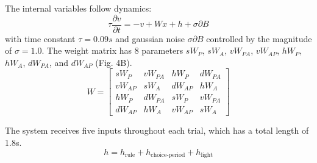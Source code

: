 \documentclass[11pt]{article}
\begin{document}
 The internal variables follow dynamics:
\begin{equation}
\tau \frac{\partial v}{\partial t} = -v + Wx + h + \sigma \partial B
\end{equation}
with time constant $\tau = 0.09s$ and gaussian noise $\sigma \partial B$ controlled by the magnitude of $\sigma=1.0$.  The weight matrix has 8 parameters $sW_P$, $sW_A$, $vW_{PA}$, $vW_{AP}$, $hW_P$, $hW_A$, $dW_{PA}$, and $dW_{AP}$ (Fig. 4B).
\begin{equation}
W = \begin{bmatrix} sW_P & vW_{PA} & hW_P & dW_{PA}  \\ vW_{AP}  & sW_A & dW_{AP}  & hW_A \\ hW_P & dW_{PA}  & sW_P & vW_{PA}  \\ dW_{AP}  & hW_A & vW_{AP}  & sW_A \end{bmatrix}
\end{equation}

The system receives five inputs throughout each trial, which has a total length of 1.8s.
\begin{equation}
h = h_{\text{rule}} + h_{\text{choice-period}} + h_{\text{light}}
\end{equation}
\end{document}
